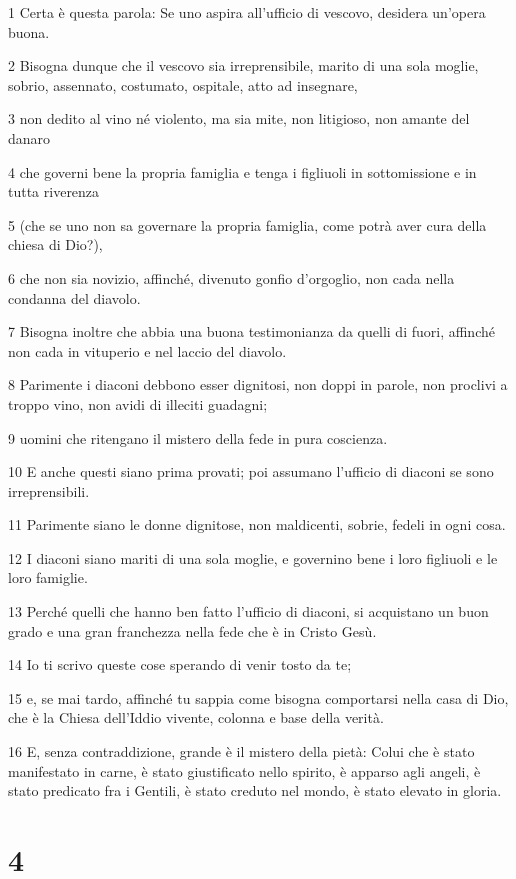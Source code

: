 \par 1 Certa è questa parola: Se uno aspira all'ufficio di vescovo, desidera un'opera buona.
\par 2 Bisogna dunque che il vescovo sia irreprensibile, marito di una sola moglie, sobrio, assennato, costumato, ospitale, atto ad insegnare,
\par 3 non dedito al vino né violento, ma sia mite, non litigioso, non amante del danaro
\par 4 che governi bene la propria famiglia e tenga i figliuoli in sottomissione e in tutta riverenza
\par 5 (che se uno non sa governare la propria famiglia, come potrà aver cura della chiesa di Dio?),
\par 6 che non sia novizio, affinché, divenuto gonfio d'orgoglio, non cada nella condanna del diavolo.
\par 7 Bisogna inoltre che abbia una buona testimonianza da quelli di fuori, affinché non cada in vituperio e nel laccio del diavolo.
\par 8 Parimente i diaconi debbono esser dignitosi, non doppi in parole, non proclivi a troppo vino, non avidi di illeciti guadagni;
\par 9 uomini che ritengano il mistero della fede in pura coscienza.
\par 10 E anche questi siano prima provati; poi assumano l'ufficio di diaconi se sono irreprensibili.
\par 11 Parimente siano le donne dignitose, non maldicenti, sobrie, fedeli in ogni cosa.
\par 12 I diaconi siano mariti di una sola moglie, e governino bene i loro figliuoli e le loro famiglie.
\par 13 Perché quelli che hanno ben fatto l'ufficio di diaconi, si acquistano un buon grado e una gran franchezza nella fede che è in Cristo Gesù.
\par 14 Io ti scrivo queste cose sperando di venir tosto da te;
\par 15 e, se mai tardo, affinché tu sappia come bisogna comportarsi nella casa di Dio, che è la Chiesa dell'Iddio vivente, colonna e base della verità.
\par 16 E, senza contraddizione, grande è il mistero della pietà: Colui che è stato manifestato in carne, è stato giustificato nello spirito, è apparso agli angeli, è stato predicato fra i Gentili, è stato creduto nel mondo, è stato elevato in gloria.

\chapter{4}


